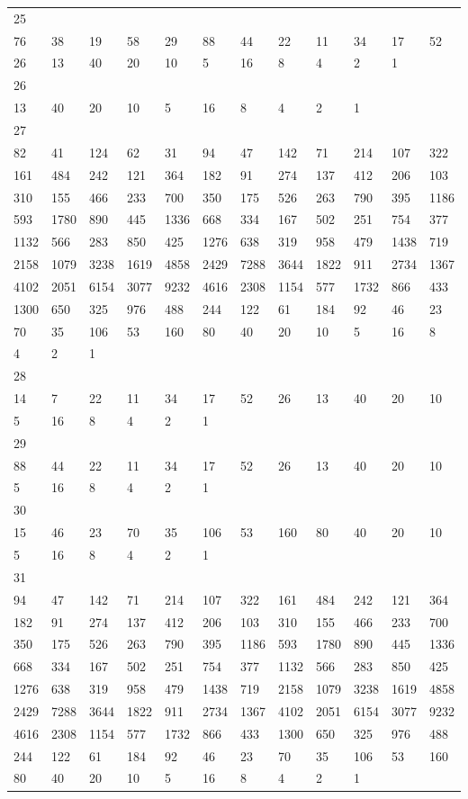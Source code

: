 \begin{longtable}{llllllllllll}
25&&&&&&&&&&&\\
76& 38& 19& 58& 29& 88& 44& 22& 11& 34& 17& 52\\
26& 13& 40& 20& 10& 5& 16& 8& 4& 2& 1& \\

26&&&&&&&&&&&\\
13& 40& 20& 10& 5& 16& 8& 4& 2& 1& \\

27&&&&&&&&&&&\\
82& 41& 124& 62& 31& 94& 47& 142& 71& 214& 107& 322\\
161& 484& 242& 121& 364& 182& 91& 274& 137& 412& 206& 103\\
310& 155& 466& 233& 700& 350& 175& 526& 263& 790& 395& 1186\\
593& 1780& 890& 445& 1336& 668& 334& 167& 502& 251& 754& 377\\
1132& 566& 283& 850& 425& 1276& 638& 319& 958& 479& 1438& 719\\
2158& 1079& 3238& 1619& 4858& 2429& 7288& 3644& 1822& 911& 2734& 1367\\
4102& 2051& 6154& 3077& 9232& 4616& 2308& 1154& 577& 1732& 866& 433\\
1300& 650& 325& 976& 488& 244& 122& 61& 184& 92& 46& 23\\
70& 35& 106& 53& 160& 80& 40& 20& 10& 5& 16& 8\\
4& 2& 1& \\

28&&&&&&&&&&&\\
14& 7& 22& 11& 34& 17& 52& 26& 13& 40& 20& 10\\
5& 16& 8& 4& 2& 1& \\

29&&&&&&&&&&&\\
88& 44& 22& 11& 34& 17& 52& 26& 13& 40& 20& 10\\
5& 16& 8& 4& 2& 1& \\

30&&&&&&&&&&&\\
15& 46& 23& 70& 35& 106& 53& 160& 80& 40& 20& 10\\
5& 16& 8& 4& 2& 1& \\

31&&&&&&&&&&&\\
94& 47& 142& 71& 214& 107& 322& 161& 484& 242& 121& 364\\
182& 91& 274& 137& 412& 206& 103& 310& 155& 466& 233& 700\\
350& 175& 526& 263& 790& 395& 1186& 593& 1780& 890& 445& 1336\\
668& 334& 167& 502& 251& 754& 377& 1132& 566& 283& 850& 425\\
1276& 638& 319& 958& 479& 1438& 719& 2158& 1079& 3238& 1619& 4858\\
2429& 7288& 3644& 1822& 911& 2734& 1367& 4102& 2051& 6154& 3077& 9232\\
4616& 2308& 1154& 577& 1732& 866& 433& 1300& 650& 325& 976& 488\\
244& 122& 61& 184& 92& 46& 23& 70& 35& 106& 53& 160\\
80& 40& 20& 10& 5& 16& 8& 4& 2& 1& \\


\end{longtable}
